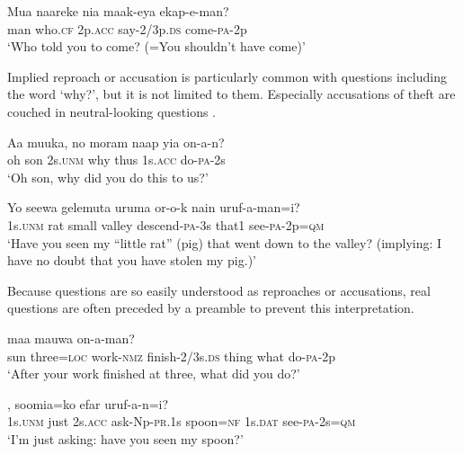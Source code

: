 \ea%
\label{ex:x1207}
\gll Mua  naareke  nia  maak-eya  ekap-e-man? \\
man  who.\textsc{cf}  2p.\textsc{acc}  say-2/3p.\textsc{ds}  come-\textsc{pa}-2p      \\
\glt `Who told you to come? (=You shouldn't have come)'
\z





Implied reproach or accusation is particularly common with  questions including the word  `why?', but it is not limited to them. Especially accusations of theft are couched in neutral-looking questions .

\ea%
\label{ex:x1208}
\gll Aa  muuka,  no  moram  naap  yia  on-a-n? \\
oh  son  2s.\textsc{unm}  why  thus  1s.\textsc{acc}  do-\textsc{pa}-2s      \\
\glt `Oh son, why did you do this to us?'
\z





\ea%
\label{ex:x1209}
\gll Yo  seewa  gelemuta  uruma  or-o-k  nain  uruf-a-man=i? \\
 1s.\textsc{unm}  rat  small  valley  descend-\textsc{pa}-3s  that1  see-\textsc{pa}-2p=\textsc{qm}     \\
\glt `Have you seen my ``little rat'' (pig) that went down to the valley? (implying: I have no doubt that you have stolen my pig.)'
\z




Because questions are so easily understood as reproaches or accusations, real questions are often preceded by a preamble to prevent this interpretation.

\ea%
\label{ex:x1210}
\gll [Ama  arow=pa  mauw-owa  weeser-eya]  maa  mauwa  on-a-man? \\
 sun  three=\textsc{loc}  work-\textsc{nmz}  finish-2/3s.\textsc{ds}  thing  what  do-\textsc{pa}-2p     \\
\glt `After your work finished at three, what did you do?'
\z





\ea%
\label{ex:x1211}
,  soomia=ko  efar uruf-a-n=i? \\
1s.\textsc{unm}  just  2s.\textsc{acc}  ask-Np-\textsc{pr}.1s  spoon=\textsc{nf}  1s.\textsc{dat}  see-\textsc{pa}-2s=\textsc{qm}    \\
\glt `I'm just asking: have you seen my spoon?'
\z









